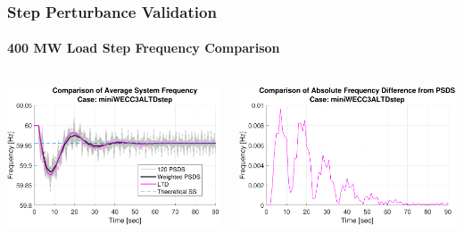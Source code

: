 \documentclass[14pt, unknownkeysallowed]{beamer}
\begin{document}
\begin{frame}
\frametitle{Step Perturbance Validation}
\framesubtitle{400 MW Load Step Frequency Comparison}
\begin{columns}
	\begin{column}{.5\linewidth}
		\includegraphics[width=\linewidth]{miniWECC3ALTDstepF3}
	\end{column}
	\begin{column}{.5\linewidth}
		\includegraphics[width=\linewidth]{miniWECC3ALTDstepRelF}
	\end{column}
\end{columns}
\end{frame}
\end{document}
